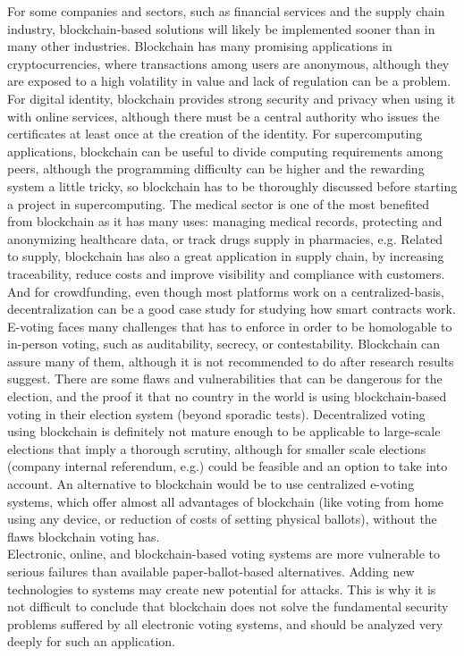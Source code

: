 \documentclass[10pt]{article}
\begin{document}
\begin{multicols}{2}
For some companies and sectors, such as financial services and the supply chain industry, blockchain-based solutions will likely be implemented sooner than in many other industries. Blockchain has many promising applications in cryptocurrencies, where transactions among users are anonymous, although they are exposed to a high volatility in value and lack of regulation can be a problem. For digital identity, blockchain provides strong security and privacy when using it with online services, although there must be a central authority who issues the certificates at least once at the creation of the identity. For supercomputing applications, blockchain can be useful to divide computing requirements among peers, although the programming difficulty can be higher and the rewarding system a little tricky, so blockchain has to be thoroughly discussed before starting a project in supercomputing. The medical sector is one of the most benefited from blockchain as it has many uses: managing medical records, protecting and anonymizing healthcare data, or track drugs supply in pharmacies, e.g. Related to supply, blockchain has also a great application in supply chain, by increasing traceability, reduce costs and improve visibility and compliance with customers. And for crowdfunding, even though most platforms work on a centralized-basis, decentralization can be a good case study for studying how smart contracts work.\\

E-voting faces many challenges that has to enforce in order to be homologable to in-person voting, such as auditability, secrecy, or contestability. Blockchain can assure many of them, although it is not recommended to do after research results suggest. There are some flaws and vulnerabilities that can be dangerous for the election, and the proof it that no country in the world is using blockchain-based voting in their election system (beyond sporadic tests). Decentralized voting using blockchain is definitely not mature enough to be applicable to large-scale elections that imply a thorough scrutiny, although for smaller scale elections (company internal referendum, e.g.) could be feasible and an option to take into account. An alternative to blockchain would be to use centralized e-voting systems, which offer almost all advantages of blockchain (like voting from home using any device, or reduction of costs of setting physical ballots), without the flaws blockchain voting has.\\

Electronic, online, and blockchain-based voting systems are more vulnerable to serious failures than available paper-ballot-based alternatives. Adding new technologies to systems may create new potential for attacks. This is why it is not difficult to conclude that blockchain does not solve the fundamental security problems suffered by all electronic voting systems, and should be analyzed very deeply for such an application.\\


\end{multicols}
\end{document}
